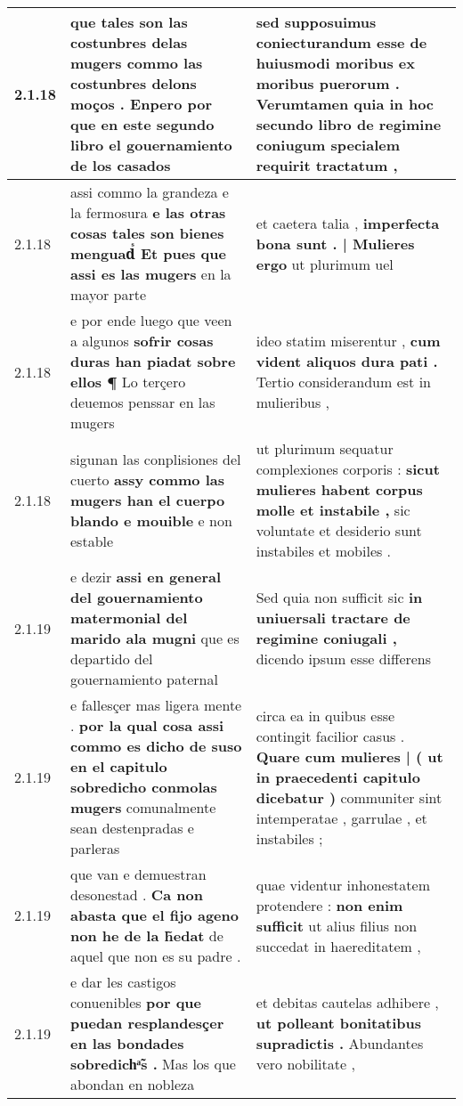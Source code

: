 \begin{tabular}{|p{1cm}|p{6.5cm}|p{6.5cm}|}
2.1.18 & que tales son las costunbres delas mugers \textbf{ commo las costunbres delons moços . } Enpero por que en este segundo libro el gouernamiento de los casados & sed supposuimus coniecturandum esse de huiusmodi moribus \textbf{ ex moribus puerorum . } Verumtamen quia in hoc secundo libro de regimine coniugum specialem requirit tractatum , \\\hline
2.1.18 & assi commo la grandeza e la fermosura \textbf{ e las otras cosas tales son bienes menguadᷤ Et pues que assi es las mugers } en la mayor parte & et caetera talia , \textbf{ imperfecta bona sunt . | Mulieres ergo } ut plurimum uel \\\hline
2.1.18 & e por ende luego que veen a algunos \textbf{ sofrir cosas duras han piadat sobre ellos ¶ } Lo terçero deuemos penssar en las mugers & ideo statim miserentur , \textbf{ cum vident aliquos dura pati . } Tertio considerandum est in mulieribus , \\\hline
2.1.18 & sigunan las conplisiones del cuerto \textbf{ assy commo las mugers han el cuerpo blando e mouible } e non estable & ut plurimum sequatur complexiones corporis : \textbf{ sicut mulieres habent corpus molle et instabile , } sic voluntate et desiderio sunt instabiles et mobiles . \\\hline
2.1.19 & e dezir \textbf{ assi en general del gouernamiento matermonial del marido ala mugni } que es departido del gouernamiento paternal & Sed quia non sufficit sic \textbf{ in uniuersali tractare de regimine coniugali , } dicendo ipsum esse differens \\\hline
2.1.19 & e fallesçer mas ligera mente . \textbf{ por la qual cosa assi commo es dicho de suso en el capitulo sobredicho conmolas mugers } comunalmente sean destenpradas e parleras & circa ea in quibus esse contingit facilior casus . \textbf{ Quare cum mulieres | ( ut in praecedenti capitulo dicebatur ) } communiter sint intemperatae , garrulae , et instabiles ; \\\hline
2.1.19 & que van e demuestran desonestad . \textbf{ Ca non abasta que el fijo ageno non he de la h̃edat } de aquel que non es su padre . & quae videntur inhonestatem protendere : \textbf{ non enim sufficit } ut alius filius non succedat in haereditatem , \\\hline
2.1.19 & e dar les castigos conuenibles \textbf{ por que puedan resplandesçer en las bondades sobredichͣ̃s . } Mas los que abondan en nobleza & et debitas cautelas adhibere , \textbf{ ut polleant bonitatibus supradictis . } Abundantes vero nobilitate , \\\hline

\end{tabular}
